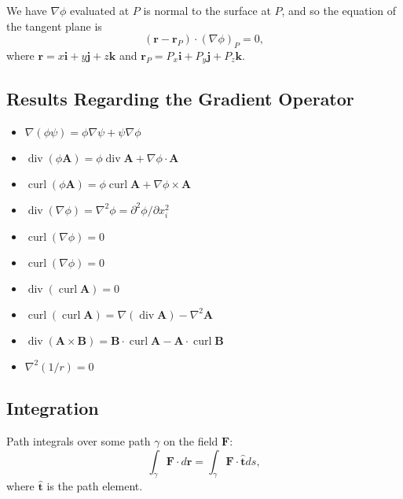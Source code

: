 \documentclass[
]{article}
\theoremstyle{definition}
\theoremstyle{definition}
\begin{document}
We have \(\nabla \phi\) evaluated at \(P\) is normal to the surface at
\(P\), and so the equation of the tangent plane is
\[(\mathbf{r} - \mathbf{r}_P) \cdot (\nabla \phi)_P = 0,\] where
\(\mathbf{r} = x\mathbf{i} + y\mathbf{j} + z\mathbf{k}\) and
\(\mathbf{r}_P = P_x\mathbf{i} + P_y\mathbf{j} + P_z\mathbf{k}\).

\hypertarget{results-regarding-the-gradient-operator}{%
\subsection{Results Regarding the Gradient
Operator}\label{results-regarding-the-gradient-operator}}

\begin{itemize}
  \item \(\nabla(\phi \psi) = \phi \nabla \psi + \psi \nabla \phi\)
  \item \(\mathop{\mathrm{div}}(\phi \mathbf{A}) = \phi \mathop{\mathrm{div}}\mathbf{A} + \nabla \phi \cdot \mathbf{A}\)
  \item \(\mathop{\mathrm{curl}}(\phi\mathbf{A}) = \phi \mathop{\mathrm{curl}}\mathbf{A} + \nabla \phi \times \mathbf{A}\)
  \item \(\mathop{\mathrm{div}}(\nabla \phi) = \nabla^2 \phi = \partial^2 \phi / \partial x_i^2\)
  \item \(\mathop{\mathrm{curl}}(\nabla \phi) = 0\)
  \item \(\mathop{\mathrm{curl}}(\nabla \phi) = 0\)
  \item \(\mathop{\mathrm{div}}(\mathop{\mathrm{curl}}\mathbf{A}) = 0\)
  \item \(\mathop{\mathrm{curl}}(\mathop{\mathrm{curl}}\mathbf{A}) = \nabla(\mathop{\mathrm{div}}\mathbf{A}) - \nabla^2 \mathbf{A}\)
  \item \(\mathop{\mathrm{div}}(\mathbf{A} \times \mathbf{B}) = \mathbf{B} \cdot \mathop{\mathrm{curl}}\mathbf{A} - 
    \mathbf{A} \cdot \mathop{\mathrm{curl}}\mathbf{B}\)
  \item \(\nabla^2 (1 / r) = 0\)
\end{itemize}

\hypertarget{integration}{%
\subsection{Integration}\label{integration}}

Path integrals over some path \(\gamma\) on the field \(\mathbf{F}\):
\[\int_\gamma \mathbf{F} \cdot d\mathbf{r} = \int_\gamma \mathbf{F} \cdot \hat{\mathbf{t}} ds,\]
where \(\hat{\mathbf{t}}\) is the path element.
\end{document}
